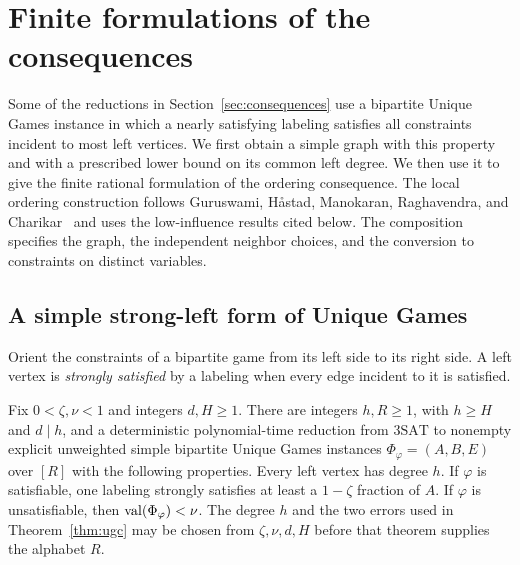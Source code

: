 \section{Finite formulations of the consequences}
\label{app:finite-consequences}

Some of the reductions in Section~\ref{sec:consequences} use a bipartite
Unique Games instance in which a nearly satisfying labeling satisfies
all constraints incident to most left vertices.  We first obtain a simple
graph with this property and with a prescribed lower bound on its common
left degree.  We then use it to give the finite rational formulation of
the ordering consequence.  The local ordering construction follows
Guruswami, H\aa stad, Manokaran, Raghavendra, and
Charikar~\cite{GuruswamiEtAl2011OrderingCSP} and uses the
low-influence results cited below.  The composition specifies the graph,
the independent neighbor choices, and the conversion to constraints on distinct
variables.

\subsection{A simple strong-left form of Unique Games}

Orient the constraints of a bipartite game from its left side to its
right side.  A left vertex is \emph{strongly satisfied} by a labeling
when every edge incident to it is satisfied.

\begin{lemma}\label{lem:simple-strong-left}
Fix \(0<\zeta,\nu<1\) and integers \(d,H\ge1\).  There are integers
\(h,R\ge1\), with \(h\ge H\) and \(d\mid h\), and a deterministic
polynomial-time reduction from \(\mathrm{3SAT}\) to nonempty explicit
unweighted simple bipartite Unique Games instances
\(\Phi_\varphi=(A,B,E)\) over \([R]\) with the following properties.
Every left vertex has degree \(h\).  If \(\varphi\) is satisfiable, one
labeling strongly satisfies at least a \(1-\zeta\) fraction of \(A\).
If \(\varphi\) is unsatisfiable, then \(\operatorname{val}(\Phi_\varphi)<\nu\).
The degree \(h\) and the two errors used in
Theorem~\ref{thm:ugc} may be chosen from \(\zeta,\nu,d,H\) before that
theorem supplies the alphabet \(R\).
\end{lemma}

